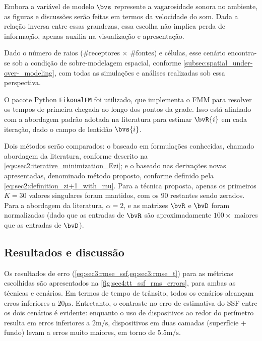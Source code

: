 Embora a variável de modelo $\bvs$ represente a vagarosidade sonora no ambiente, as figuras e discussões serão feitas em termos da velocidade do som. Dada a relação inversa entre essas grandezas, essa escolha não implica perda de informação, apenas auxilia na visualização e apresentação.

Dado o número de raios (\#receptores $\times$ \#fontes) e células, esse cenário encontra-se sob a condição de sobre-modelagem espacial, conforme \cref{subsec:spatial_under-over-_modeling}, com todas as simulações e análises realizadas sob essa perspectiva.

O pacote Python \texttt{EikonalFM} \cite{ganster_eikonalfm_2025} foi utilizado, que implementa o FMM \cite{sethian_fast_1999,chopp_improvements_2001} para resolver os tempos de primeira chegada ao longo dos pontos da grade. Isso está alinhado com a abordagem padrão adotada na literatura para estimar $\bvR{i}$ em cada iteração, dado o campo de lentidão $\bvs{i}$.

Dois métodos serão comparados: o baseado em formulações conhecidas, chamado abordagem da literatura, conforme descrito na \cref{eqs:sec2:iterative_minimization_Ezi}; e o baseado nas derivações novas apresentadas, denominado método proposto, conforme definido pela \cref{eq:sec2:definition_zi+1_with_mu}. Para a técnica proposta, apenas os primeiros $K=30$ valores singulares foram mantidos, com os $90$ restantes sendo zerados. Para a abordagem da literatura, $\alpha = 2$, e as matrizes $\bvR$ e $\bvD$ foram normalizadas (dado que as entradas de $\bvR$ são aproximadamente $100\times$ maiores que as entradas de $\bvD$).





\subsection{Resultados e discussão}

Os resultados de erro (\cref{eq:sec3:rmse_ssf,eq:sec3:rmse_t}) para as métricas escolhidas são apresentados na \cref{fig:sec4:tt_ssf_rms_errors}, para ambas as técnicas e cenários. Em termos de tempo de trânsito, todos os cenários alcançam erros inferiores a $20\si{\micro\second}$. Entretanto, o contraste no erro de estimativa do SSF entre os dois cenários é evidente: enquanto o uso de dispositivos ao redor do perímetro resulta em erros inferiores a $2\si{\meter/\second}$, dispositivos em duas camadas (superfície + fundo) levam a erros muito maiores, em torno de $5.5\si{\meter/\second}$.

